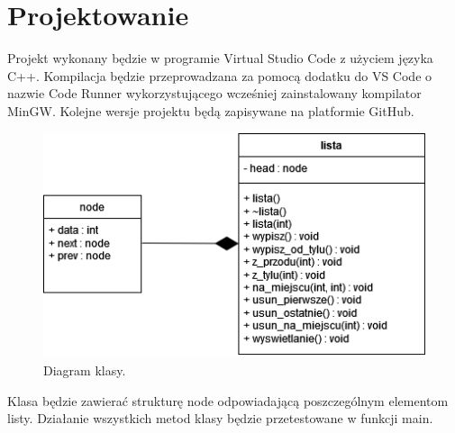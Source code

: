 	\newpage
\section{Projektowanie}		%
\hspace{0.60cm}Projekt wykonany będzie w programie Virtual Studio Code z użyciem języka C++. Kompilacja będzie przeprowadzana za pomocą dodatku do VS Code o nazwie Code Runner wykorzystującego wcześniej zainstalowany kompilator MinGW. Kolejne wersje projektu będą zapisywane na platformie GitHub.

\begin{figure}[!htb]
	\begin{center}
		\includegraphics{Dokumentacja/rys/UML.png}
		\caption{Diagram klasy.}
		\label{rys:rysunek009}
	\end{center}
\end{figure}

\hspace{0.60cm}Klasa będzie zawierać strukturę node odpowiadającą poszczególnym elementom listy. Działanie wszystkich metod klasy będzie przetestowane w funkcji main.